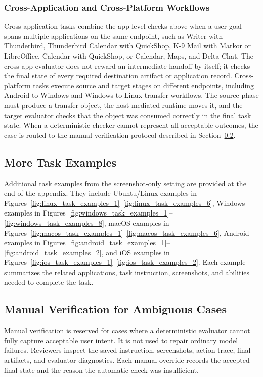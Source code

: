 \subsubsection{Cross-Application and Cross-Platform Workflows}
Cross-application tasks combine the app-level checks above when a user goal spans multiple applications on the same endpoint, such as Writer with Thunderbird, Thunderbird Calendar with QuickShop, K-9 Mail with Markor or LibreOffice, Calendar with QuickShop, or Calendar, Maps, and Delta Chat. The cross-app evaluator does not reward an intermediate handoff by itself; it checks the final state of every required destination artifact or application record. Cross-platform tasks execute source and target stages on different endpoints, including Android-to-Windows and Windows-to-Linux transfer workflows. The source phase must produce a transfer object, the host-mediated runtime moves it, and the target evaluator checks that the object was consumed correctly in the final task state. When a deterministic checker cannot represent all acceptable outcomes, the case is routed to the manual verification protocol described in Section~\ref{app:manual_verification_for_ambiguous_cases}.

\subsection{More Task Examples}
\label{app:more_task_examples}
\hypertarget{app:case_figure_list}{}
Additional task examples from the screenshot-only setting are provided at the end of the appendix. They include Ubuntu/Linux examples in Figures~\ref{fig:linux_task_examples_1}--\ref{fig:linux_task_examples_6}, Windows examples in Figures~\ref{fig:windows_task_examples_1}--\ref{fig:windows_task_examples_8}, macOS examples in Figures~\ref{fig:macos_task_examples_1}--\ref{fig:macos_task_examples_6}, Android examples in Figures~\ref{fig:android_task_examples_1}--\ref{fig:android_task_examples_2}, and iOS examples in Figures~\ref{fig:ios_task_examples_1}--\ref{fig:ios_task_examples_2}. Each example summarizes the related applications, task instruction, screenshots, and abilities needed to complete the task.

\subsection{Manual Verification for Ambiguous Cases}
\label{app:manual_verification_for_ambiguous_cases}
Manual verification is reserved for cases where a deterministic evaluator cannot fully capture acceptable user intent. It is not used to repair ordinary model failures. Reviewers inspect the saved instruction, screenshots, action trace, final artifacts, and evaluator diagnostics. Each manual override records the accepted final state and the reason the automatic check was insufficient.

